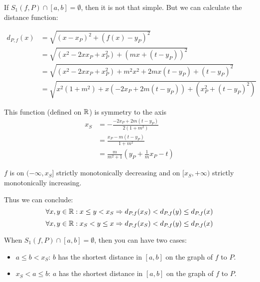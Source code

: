 If $S_1(f, P) \cap [a,b] = \emptyset$, then it is not that simple. 
But we can calculate the distance function:

\begin{align}
    d_{P,f}(x) &= \sqrt{(x-x_P)^2 + (f(x) - y_P)^2}\\
    &= \sqrt{(x^2 - 2x x_P + x_P^2) + (mx + (t-y_P))^2}\\
    &= \sqrt{(x^2 - 2x x_P + x_P^2) + m^2 x^2 + 2mx(t-y_P) + (t-y_P)^2}\\
    &= \sqrt{x^2(1+m^2) + x(-2 x_P + 2m(t-y_P)) + (x_P^2 + (t-y_P)^2)}
\end{align}

This function (defined on $\mathbb{R}$) is symmetry to the axis 
\begin{align}
    x_S &= - \frac{-2 x_P + 2m(t-y_P)}{2(1+m^2)}\\
    &= \frac{x_P - m(t-y_P)}{1+m^2}\\
    &= \frac{m}{m^2+1} (y_P + \frac{1}{m} x_P - t)
\end{align}

$f$ is on $(-\infty, x_S]$ strictly monotonically decreasing and
on $[x_S, + \infty)$ strictly monotonically increasing.

Thus we can conclude: 
\[\forall x,y \in \mathbb{R}: x \leq y < x_S \Rightarrow d_{P,f}(x_S) < d_{P,f}(y) \leq d_{P,f}(x)\]
\[\forall x,y \in \mathbb{R}: x_S < y \leq x \Rightarrow d_{P,f}(x_S) < d_{P,f}(y) \leq d_{P,f}(x)\]

When $S_1(f, P) \cap [a,b] = \emptyset$, then you can have two cases:
\begin{itemize}
    \item $a \leq b < x_S$: $b$ has the shortest distance in $[a,b]$
             on the graph of $f$ to $P$.
    \item $x_S < a \leq b$: $a$ has the shortest distance in $[a,b]$ 
             on the graph of $f$ to $P$.
\end{itemize}
